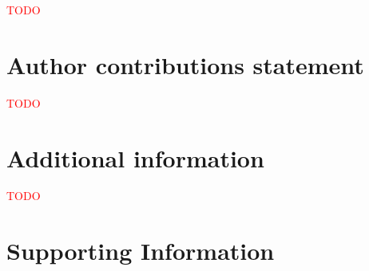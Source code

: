\documentclass[fleqn,10pt]{wlscirep}
\newcommand{\fixme}[1]{\textcolor{red}{{#1}}}
\begin{document}
\fixme{TODO}


\section*{Author contributions statement}

\fixme{TODO}


\section*{Additional information}

\fixme{TODO}

\section*{Supporting Information}

\renewcommand{\thefigure}{S\arabic{figure}}
\renewcommand{\thetable}{S\arabic{table}}
\setcounter{figure}{0}
\setcounter{table}{0}
\end{document}
